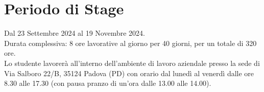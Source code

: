 \section*{Periodo di Stage}
Dal 23 Settembre 2024 al 19 Novembre 2024. \\
Durata complessiva: 8 ore lavorative al giorno per 40 giorni, per un totale di 320 ore. \\

Lo studente lavorerà all’interno dell’ambiente di lavoro aziendale presso la sede di Via Salboro 22/B, 35124 Padova (PD) con orario dal lunedì al venerdì dalle ore 8.30 alle 17.30 (con pausa pranzo di un’ora dalle 13.00 alle 14.00).

